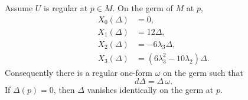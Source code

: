 \begin{lemma}\label{lem:disc}
%
%
%
Assume $U$ is regular at $p\in M$.  On the germ of $M$ at $p$,
\begin{align}
  X_0(\Delta)&=0,\label{eq:disc0}\\
  X_1(\Delta)&=12\Delta,\label{eq:disc1}\\
  X_2(\Delta)&=-6\lambda_3\Delta,\label{eq:disc2}\\
  X_3(\Delta)&=(6\lambda_3^2-10\lambda_2)\Delta.\label{eq:disc3}
\end{align}
Consequently there is a regular one-form $\omega$ on the germ such that
\begin{equation}\label{eq:dDelta}
  d\Delta=\Delta\,\omega.
\end{equation}
If $\Delta(p)=0$, then $\Delta$ vanishes identically on the germ at $p$.
\end{lemma}

